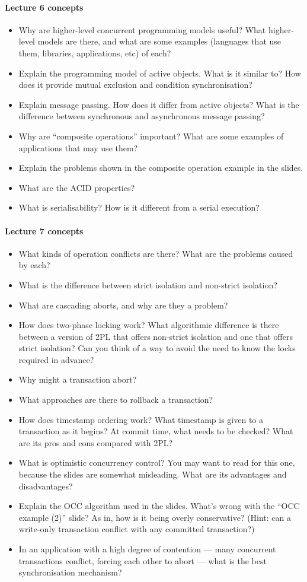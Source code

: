 \documentclass[12pt,a4paper,oneside,openright]{report}
\newcommand{\question}[2]{\paragraph{#1} #2}
\begin{document}
\question{Lecture 6 concepts}{
  \begin{itemize}
  \item Why are higher-level concurrent programming models useful?
    What higher-level models are there, and what are some examples
    (languages that use them, libraries, applications, etc) of each?
  \item Explain the programming model of active objects. What is it
    similar to? How does it provide mutual exclusion and condition
    synchronisation?
  \item Explain message passing. How does it differ from active
    objects? What is the difference between synchronous and
    asynchronous message passing?
  \item Why are ``composite operations'' important? What are some
    examples of applications that may use them?
  \item Explain the problems shown in the composite operation example
    in the slides.
  \item What are the ACID properties?
  \item What is serialisability? How is it different from a serial
    execution?
  \end{itemize}
}

\question{Lecture 7 concepts}{
  \begin{itemize}
  \item What kinds of operation conflicts are there? What are the
    problems caused by each?
  \item What is the difference between strict isolation and non-strict
    isolation?
  \item What are cascading aborts, and why are they a problem?
  \item How does two-phase locking work? What algorithmic difference
    is there between a version of 2PL that offers non-strict isolation
    and one that offers strict isolation? Can you think of a way to
    avoid the need to know the locks required in advance?
  \item Why might a transaction abort?
  \item What approaches are there to rollback a transaction?
  \item How does timestamp ordering work? What timestamp is given to a
    transaction as it begins? At commit time, what needs to be
    checked? What are its pros and cons compared with 2PL?
  \item What is optimistic concurrency control? You may want to read
    \cite[Chapter~20.6]{bacon2003operating} for this one, because the
    slides are somewhat misleading. What are its advantages and
    disadvantages?
  \item Explain the OCC algorithm used in the slides. What's wrong
    with the ``OCC example (2)'' slide? As in, how is it being overly
    conservative? (Hint: can a write-only transaction conflict with
    any committed transaction?)
  \item In an application with a high degree of contention --- many
    concurrent transactions conflict, forcing each other to abort ---
    what is the best synchronisation mechanism?
  \end{itemize}
}
\end{document}
